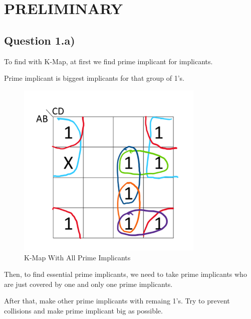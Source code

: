 \documentclass[pdftex,12pt,a4paper]{article}
\begin{document}
\section{PRELIMINARY}

\subsection{Question 1.a)}

To find with K-Map, at first we find prime implicant for implicants.

Prime implicant is biggest implicants for that group of 1's.

   \begin{figure}[H]
    	\centering
    	\includegraphics[width=0.8\textwidth]{preliminary/kmap_at_first.png}	
    	\caption{K-Map With All Prime Implicants}
    	\label{K-Map With All Prime Implicants}
    \end{figure}
    

 Then, to find essential prime implicants, we need to take prime implicants who are just covered by one and only one prime implicants.

After that, make other prime implicants with remaing 1's. Try to prevent collisions and make prime implicant big as possible. 
\end{document}
